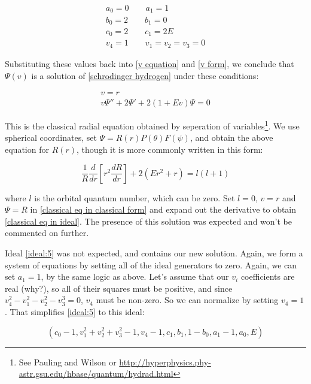 \documentclass{article}
\begin{document}
\begin{equation}
\begin{gathered}
a_0 = 0 \qquad
a_1 = 1 \\
b_0 = 2 \qquad
b_1 = 0 \\
c_0 = 2 \qquad
c_1 = 2 E \\
v_4 = 1 \qquad
v_1 = v_2 = v_3 = 0
\end{gathered}
\end{equation}

Substituting these values back into \eqref{v equation} and \eqref{v form}, we conclude that $\Psi(v)$
is a solution of \eqref{schrodinger hydrogen} under these conditions:

\begin{equation}
\label{classical eq in ideal}
\begin{gathered}
v=r \\
v \Psi'' + 2 \Psi' + 2(1 + E v) \Psi = 0
\end{gathered}
\end{equation}

This is the classical radial equation obtained by seperation of variables\footnote{See
Pauling and Wilson or
\url{http://hyperphysics.phy-astr.gsu.edu/hbase/quantum/hydrad.html}}.  We use
spherical coordinates, set $\Psi = R(r)P(\theta)F(\psi)$, and obtain the above equation for $R(r)$,
though it is more commonly written in this form:

\begin{equation}
\label{classical eq in classical form}
\frac{1}{R} \frac{d}{dr}\left[ r^2 \frac{dR}{dr}\right] + 2(Er^2 + r) = l(l+1)
\end{equation}

where $l$ is the orbital quantum number, which can be zero.  Set $l=0$, $v=r$ and $\Psi=R$ in \eqref{classical eq in classical form}
and expand out the derivative to obtain \eqref{classical eq in ideal}.  The presence of this solution was
expected and won't be commented on further.

Ideal \eqref{ideal:5} was not expected, and contains our new solution.
Again, we form a system of equations by setting all of the ideal generators to zero.
Again, we can set $a_1=1$, by the same logic as above.
Let's assume that our $v_i$ coefficients are real (why?), so all of their squares must
be positive, and since $v_4^2-v_1^2-v_2^2-v_3^3=0$, $v_4$ must be non-zero.  So we can normalize by setting $v_4=1$.
That simplifies \eqref{ideal:5} to this ideal:

\begin{equation}
\left(c_{0} - 1, v_{1}^{2} + v_{2}^{2} + v_{3}^{2} - 1, v_4 - 1, c_{1}, b_{1}, 1 - b_{0}, a_1 - 1, a_{0}, E\right)
\end{equation}
\end{document}
